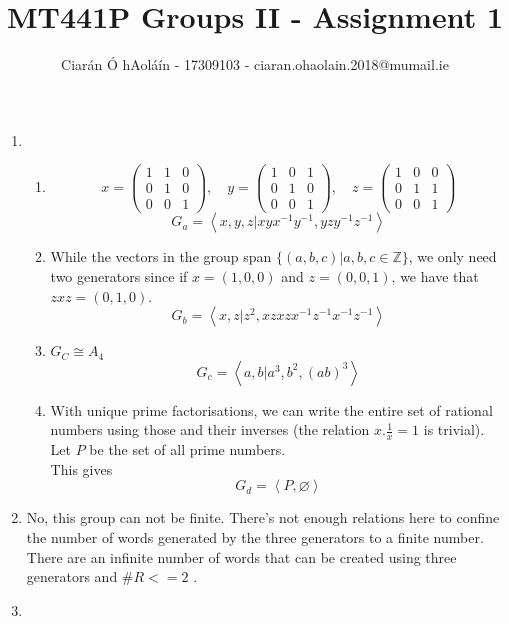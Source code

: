 \documentclass{article}
\title{MT441P Groups II - Assignment 1}
\author{Ciarán Ó hAoláín - 17309103 - ciaran.ohaolain.2018@mumail.ie}
\newcommand{\Z}{\mathbb{Z}}
\theoremstyle{definition}
\theoremstyle{remark}
\theoremstyle{example}
\begin{document}
	\maketitle
	\begin{enumerate}
		\item 
		\begin{enumerate}
			\item 
			\[x=\begin{pmatrix}
				1 & 1 & 0\\
				0 & 1 & 0\\
				0 & 0 & 1
			\end{pmatrix}, \quad y=\begin{pmatrix}
				1 & 0 & 1\\
				0 & 1 & 0\\
				0 & 0 & 1
			\end{pmatrix}, \quad z=\begin{pmatrix}
				1 & 0 & 0\\
				0 & 1 & 1\\
				0 & 0 & 1
			\end{pmatrix}\]
			\[ G_a=\left< x,y,z | xyx^{-1}y^{-1},yzy^{-1}z^{-1}\right> \]
			\item While the vectors in the group span $\{(a,b,c)|a,b,c \in \Z\}$, we only need two generators since if $x=(1,0,0)$ and $z=(0,0,1)$, we have that $zxz=(0,1,0)$.
			\[ G_b=\left< x,z | z^2,xzxzx^{-1}z^{-1}x^{-1}z^{-1} \right> \]
			\item $G_C \cong A_4$
			\[ G_c=\left<a,b|a^3,b^2,(ab)^3\right> \]
			\item With unique prime factorisations, we can write the entire set of rational numbers using those and their inverses (the relation $x.\frac{1}{x}=1$ is trivial). Let $P$ be the set of all prime numbers.\\
			This gives \[ G_d = \left<P, \varnothing \right> \]
		\end{enumerate}
		\item No, this group can not be finite. There's not enough relations here to confine the number of words generated by the three generators to a finite number. There are an infinite number of words that can be created using three generators and $\#R<=2$ .
		\item 
	\end{enumerate}
\end{document}
